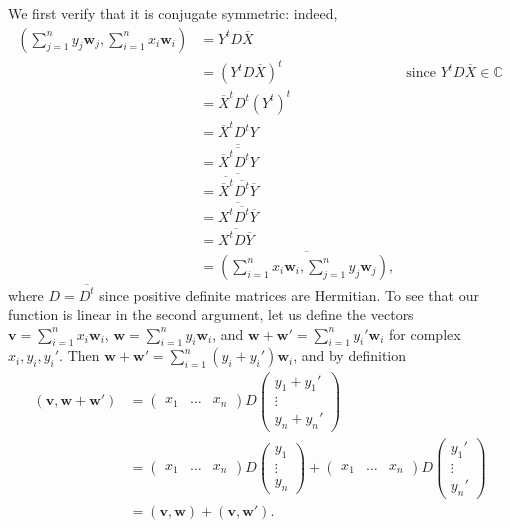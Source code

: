\documentclass[12pt]{article}
\begin{document}
We first verify that it is conjugate symmetric: indeed, 
\begin{align*}
    \left(\sum_{j=1}^ny_j\mathbf{w}_j, \sum_{i=1}^nx_i\mathbf{w}_i\right)
    &=Y^tD\overline{X}
  \\&={\left(Y^tD\overline{X}\right)^t}
      &\text{since $Y^tD\overline X\in\mathbb{C}$}
    \\&=\overline{X}^tD^t(Y^t)^t
    \\&=\overline{X}^tD^tY
    \\&=\overline{\overline{\overline{X}^tD^tY}}
    \\&=\overline{\overline{\overline{X}^t}\overline{D^t}\overline{Y}}
    \\&=\overline{{X}^t\overline{D^t}\overline{Y}}
    \\&=\overline{{X}^tD\overline{Y}}
      \\&=\overline{
    \left(\sum_{i=1}^nx_i\mathbf{w}_i, \sum_{j=1}^ny_j\mathbf{w}_j\right),
}
\end{align*}
where $D=\overline{D^t}$ since positive definite matrices are Hermitian.
To see that our function is linear in the second argument, let us define
the vectors 
$\mathbf{v}=\sum_{i=1}^nx_i\mathbf{w}_i$,
$\mathbf{w}=\sum_{i=1}^ny_i\mathbf{w}_i$, and
$\mathbf{w}+\mathbf{w'}=\sum_{i=1}^ny_i'\mathbf{w}_i$ for complex $x_i,y_i,y_i'$.
Then
$\mathbf{w}+\mathbf{w'}=\sum_{i=1}^n(y_i+y_i')\mathbf{w}_i$, and
by definition
\begin{align*}
    (\mathbf{v},\mathbf{w+w'})
    &=
    \begin{pmatrix} x_1&\ldots&x_n \end{pmatrix} 
    D
    \begin{pmatrix} y_1+y_1'\\\vdots\\y_n+y_n' \end{pmatrix} 
    \\&=
    \begin{pmatrix} x_1&\ldots&x_n \end{pmatrix} 
    D
    \begin{pmatrix} y_1\\\vdots\\y_n \end{pmatrix} 
    +
    \begin{pmatrix} x_1&\ldots&x_n \end{pmatrix} 
    D
    \begin{pmatrix} y_1'\\\vdots\\y_n' \end{pmatrix} 
                       \\&=
    (\mathbf{v},\mathbf{w})+(\mathbf{v},\mathbf{w'}).
\end{align*}
\end{document}
